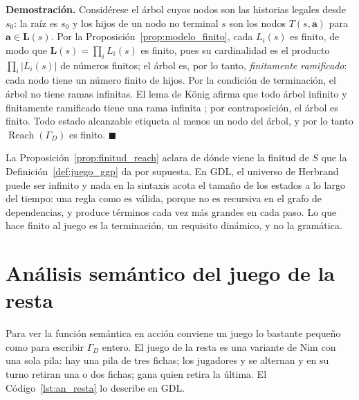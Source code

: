 \noindent\textbf{Demostración.} Considérese el árbol cuyos nodos son las historias legales desde $s_0$: la raíz es $s_0$ y los hijos de un nodo no terminal $s$ son los nodos $T(s, \mathbf a)$ para $\mathbf a \in \mathbf L(s)$. Por la Proposición~\ref{prop:modelo_finito}, cada $L_i(s)$ es finito, de modo que $\mathbf L(s) = \prod_i L_i(s)$ es finito, pues su cardinalidad es el producto $\prod_i |L_i(s)|$ de números finitos; el árbol es, por lo tanto, \emph{finitamente ramificado}: cada nodo tiene un número finito de hijos. Por la condición de terminación, el árbol no tiene ramas infinitas. El lema de König afirma que todo árbol infinito y finitamente ramificado tiene una rama infinita \cite{Konig1927}; por contraposición, el árbol es finito. Todo estado alcanzable etiqueta al menos un nodo del árbol, y por lo tanto $\operatorname{Reach}(\Gamma_D)$ es finito. \hfill $\blacksquare$

\begin{observacion}
La Proposición~\ref{prop:finitud_reach} aclara de dónde viene la finitud de $S$ que la Definición~\ref{def:juego_ggp} da por supuesta. En GDL, el universo de Herbrand puede ser infinito y nada en la sintaxis acota el tamaño de los estados a lo largo del tiempo: una regla como  es válida, porque  no es recursiva en el grafo de dependencias, y produce términos cada vez más grandes en cada paso. Lo que hace finito al juego es la terminación, un requisito dinámico, y no la gramática.
\end{observacion}

\section{Análisis semántico del juego de la resta}
\label{sec:an_ejemplo_resta}

Para ver la función semántica en acción conviene un juego lo bastante pequeño como para escribir $\Gamma_D$ entero. El juego de la resta es una variante de Nim con una sola pila: hay una pila de tres fichas; los jugadores  y  se alternan y en su turno retiran una o dos fichas; gana quien retira la última. El Código~\ref{lst:an_resta} lo describe en GDL.

